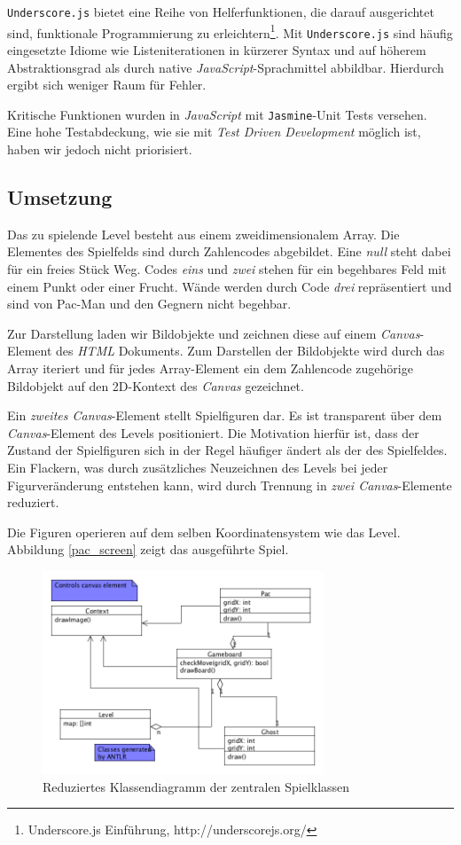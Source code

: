 \documentclass[conference]{IEEEtran}
\begin{document}
\texttt{Underscore.js} bietet eine Reihe von Helferfunktionen, die darauf ausgerichtet sind, funktionale Programmierung zu erleichtern\footnote[3]{Underscore.js Einführung, http://underscorejs.org/}. Mit \texttt{Underscore.js} sind häufig eingesetzte Idiome wie Listeniterationen in kürzerer Syntax und auf höherem Abstraktionsgrad als durch native \emph{JavaScript}-Sprachmittel abbildbar. Hierdurch ergibt sich weniger Raum für Fehler.

Kritische Funktionen wurden in \emph{JavaScript} mit \texttt{Jasmine}-Unit Tests versehen. Eine hohe Testabdeckung, wie sie mit \emph{Test Driven Development} möglich ist, haben wir jedoch nicht priorisiert.

\subsection{Umsetzung}
\label{umsetz}
Das zu spielende Level besteht aus einem zweidimensionalem Array. Die Elementes des Spielfelds sind durch Zahlencodes abgebildet. Eine \emph{null} steht dabei für ein freies Stück Weg. Codes \emph{eins} und \emph{zwei} stehen für ein begehbares Feld mit einem Punkt oder einer Frucht. Wände werden durch Code \emph{drei} repräsentiert und sind von Pac-Man und den Gegnern nicht begehbar.

Zur Darstellung laden wir Bildobjekte und zeichnen diese auf einem \emph{Canvas}-Element des \emph{HTML} Dokuments. Zum Darstellen der Bildobjekte wird durch das Array iteriert und für jedes Array-Element ein dem Zahlencode zugehörige Bildobjekt auf den 2D-Kontext des \emph{Canvas} gezeichnet.

Ein \emph{zweites Canvas}-Element stellt Spielfiguren dar. Es ist transparent über dem \emph{Canvas}-Element des Levels positioniert. Die Motivation hierfür ist, dass der Zustand der Spielfiguren sich in der Regel häufiger ändert als der des Spielfeldes. Ein Flackern, was durch zusätzliches Neuzeichnen des Levels bei jeder Figurveränderung entstehen kann, wird durch Trennung in \emph{zwei Canvas}-Elemente reduziert.

Die Figuren operieren auf dem selben Koordinatensystem wie das Level. Abbildung \ref{pac_screen} zeigt das ausgeführte Spiel.

\begin{figure}[!t]
\centering
\includegraphics[width=3.3in]{gameboard_and_figures.png}

\caption{Reduziertes Klassendiagramm der zentralen Spielklassen}
\label{main_classes}
\end{figure}
\end{document}
